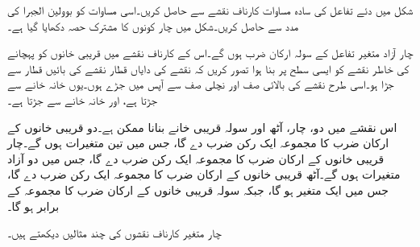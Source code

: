  شکل   میں دئے  تفاعل کی سادہ مساوات کارناف نقشے  سے  حاصل کریں۔اسی مساوات کو بوولین الجبرا کی مدد سے حاصل کریں۔شکل میں چار کونوں کا مشترک حصہ  دکھایا گیا ہے۔ 


چار آزاد متغیر تفاعل کے سولہ ارکان ضرب ہوں گے۔اس کے  کارناف نقشے میں قریبی خانوں کو پہچانے کی خاطر نقشے کو ایسی سطح پر بنا ہوا تصور کریں کہ نقشے کی  دایاں قطار نقشے کی  بائیں قطار سے جڑا  ہو۔اسی طرح نقشے کی  بالائی  صف اور  نچلی صف سے آپس میں  جڑے ہوں۔یوں  خانہ   خانے سے جڑتا ہے، اور   خانہ   خانے سے جڑتا ہے۔

اس نقشے میں دو، چار، آٹھ اور سولہ قریبی خانے بنانا  ممکن ہے۔دو قریبی خانوں کے ارکان ضرب کا مجموعہ ایک    رکن ضرب دے گا،  جس میں تین  متغیرات  ہوں  گے۔چار قریبی خانوں کے ارکان ضرب کا مجموعہ ایک رکن ضرب دے گا،  جس میں دو آزاد متغیرات ہوں گے۔آٹھ قریبی خانوں کے ارکان ضرب کا مجموعہ ایک رکن ضرب  دے گا،  جس میں ایک متغیر  ہو گا،  جبکہ سولہ قریبی خانوں کے ارکان ضرب کا مجموعہ  کے برابر  ہو گا۔

چار متغیر کارناف نقشوں کی  چند مثالیں  دیکھتے ہیں۔

